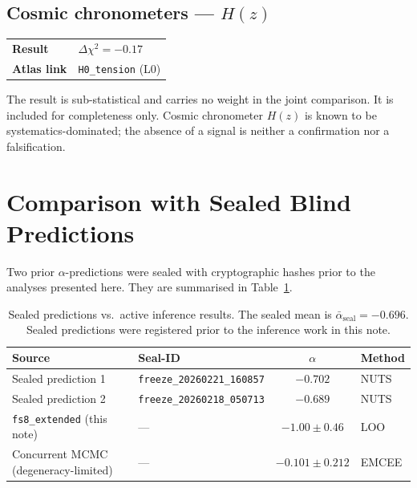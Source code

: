 \documentclass[11pt,a4paper]{article}
\begin{document}
\subsection{Cosmic chronometers --- $H(z)$}

\begin{tabular}{@{}lp{}@{}}
\textbf{Result} & $\Delta\chi^2 = -0.17$ \\
\textbf{Atlas link} & \texttt{H0\_tension} (L0) \\
\end{tabular}

\vspace{4pt}
The result is sub-statistical and carries no weight in the joint comparison. It is included for completeness only. Cosmic chronometer $H(z)$ is known to be systematics-dominated; the absence of a signal is neither a confirmation nor a falsification.

\section{Comparison with Sealed Blind Predictions}

Two prior $\alpha$-predictions were sealed with cryptographic hashes prior to the analyses presented here. They are summarised in Table~\ref{tab:seals}.

\begin{table}[!ht]
\centering
\small
\renewcommand{\arraystretch}{1.4}
\begin{tabular}{@{}llcl@{}}
\toprule
\textbf{Source} & \textbf{Seal-ID} & \textbf{$\alpha$} & \textbf{Method} \\
\midrule
Sealed prediction 1 & \texttt{freeze\_20260221\_160857} & $-0.702$ & NUTS \\
Sealed prediction 2 & \texttt{freeze\_20260218\_050713} & $-0.689$ & NUTS \\
\midrule
\texttt{fs8\_extended} (this note) & --- & $-1.00 \pm 0.46$ & LOO \\
Concurrent MCMC (degeneracy-limited) & --- & $-0.101 \pm 0.212$ & EMCEE \\
\bottomrule
\end{tabular}
\caption{Sealed predictions vs.\ active inference results. The sealed mean is $\bar\alpha_{\mathrm{seal}} = -0.696$. Sealed predictions were registered prior to the inference work in this note.}
\label{tab:seals}
\end{table}
\end{document}
